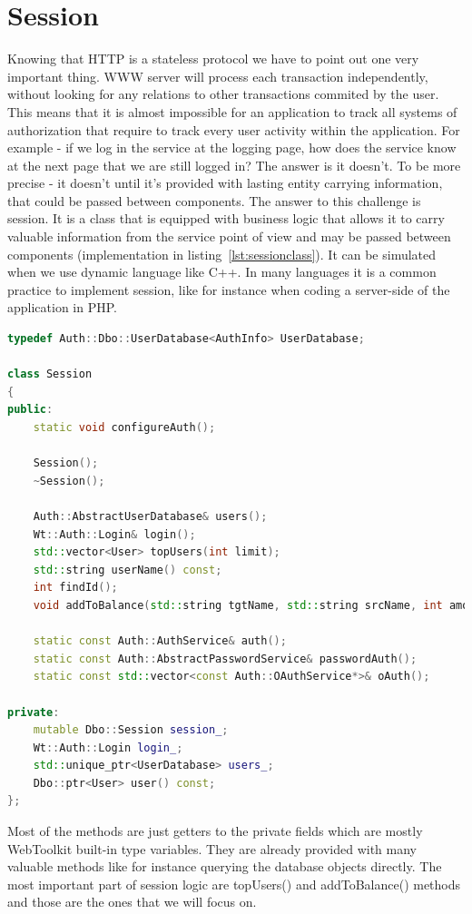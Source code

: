 \documentclass[a4paper,12pt]{book}
\begin{document}
\section{Session}
{
Knowing that HTTP is a stateless protocol we have to point out one very important thing. WWW server will process each transaction independently, without looking for any relations to other transactions commited by the user. This means that it is almost impossible for an application to track all systems of authorization that require to track every user activity within the application. For example - if we log in the service at the logging page, how does the service know at the next page that we are still logged in? The answer is it doesn't. To be more precise - it doesn't until it's provided with lasting entity carrying information, that could be passed between components. The answer to this challenge is session. It is a class that is equipped with business logic that allows it to carry valuable information from the service point of view and may be passed between components (implementation in listing~\ref{lst:sessionclass}). It can be simulated when we use dynamic language like C++. In many languages it is a common practice to implement session, like for instance when coding a server-side of the application in PHP. 

\bigskip
\begin{lstlisting}[frame=single, label={lst:sessionclass}, basicstyle=\small, language=C++, caption={Session.h file.}, captionpos=b]
typedef Auth::Dbo::UserDatabase<AuthInfo> UserDatabase;

class Session
{
public:
	static void configureAuth();

	Session();
	~Session();

	Auth::AbstractUserDatabase& users();
	Wt::Auth::Login& login();
	std::vector<User> topUsers(int limit);
	std::string userName() const;
	int findId();
	void addToBalance(std::string tgtName, std::string srcName, int amount);

	static const Auth::AuthService& auth();
	static const Auth::AbstractPasswordService& passwordAuth();
	static const std::vector<const Auth::OAuthService*>& oAuth();

private:
	mutable Dbo::Session session_;
	Wt::Auth::Login login_;
	std::unique_ptr<UserDatabase> users_;
	Dbo::ptr<User> user() const;
};
\end{lstlisting}

Most of the methods are just getters to the private fields which are mostly WebToolkit built-in type variables. They are already provided with many valuable methods like for instance querying the database objects directly. The most important part of session logic are topUsers() and addToBalance() methods and those are the ones that we will focus on. 

}
\end{document}

